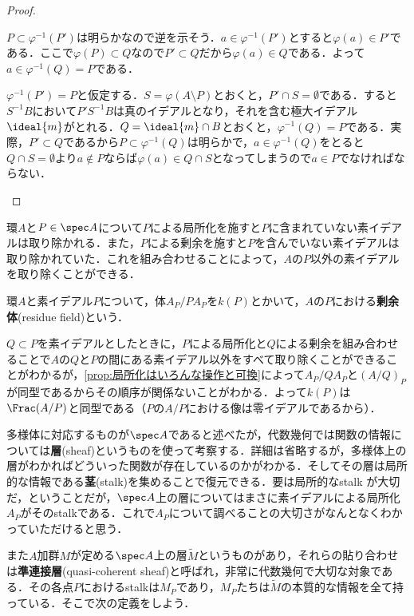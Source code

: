 \begin{proof}
	\begin{eqv}
		\item $P\subset\varphi^{-1}(P')$は明らかなので逆を示そう．$a\in\varphi^{-1}(P')$とすると$\varphi(a)\in P'$である．ここで$\varphi(P)\subset Q$なので$P'\subset Q$だから$\varphi(a)\in Q$である．よって$a\in\varphi^{-1}(Q)=P$である．
		
		\item 	$\varphi^{-1}(P')=P$と仮定する．$S=\varphi(A\setminus P)$とおくと，$P'\cap S=\emptyset$である．すると$S^{-1}B$において$P'S^{-1}B$は真のイデアルとなり，それを含む極大イデアル$\ideal{m}$がとれる．$Q=\ideal{m}\cap B$とおくと，$\varphi^{-1}(Q)=P$である．実際，$P'\subset Q$であるから$P\subset\varphi^{-1}(Q)$は明らかで，$a\in\varphi^{-1}(Q)$をとると$Q\cap S=\emptyset$より$a\not\in P$ならば$\varphi(a)\in Q\cap S$となってしまうので$a\in P$でなければならない．
	\end{eqv}
\end{proof}

環$A$と$P\in\spec A$について$P$による局所化を施すと$P$に含まれていない素イデアルは取り除かれる．また，$P$による剰余を施すと$P$を含んでいない素イデアルは取り除かれていた．これを組み合わせることによって，$A$の$P$以外の素イデアルを取り除くことができる．
\begin{defi}[剰余体]
	環$A$と素イデアル$P$について，体$A_P/PA_P$を$k(P)$とかいて，$A$の$P$における\textbf{剰余体}(residue field)という．
\end{defi}

$Q\subset P$を素イデアルとしたときに，$P$による局所化と$Q$による剰余を組み合わせることで$A$の$Q$と$P$の間にある素イデアル以外をすべて取り除くことができることがわかるが，\ref{prop:局所化はいろんな操作と可換}によって$A_P/QA_P$と$(A/Q)_P$が同型であるからその順序が関係ないことがわかる．よって$k(P)$は$\Frac (A/P)$と同型である（$P$の$A/P$における像は零イデアルであるから）．

\begin{tightcurve}
	多様体に対応するものが$\spec A$であると述べたが，代数幾何では関数の情報については\textbf{層}(sheaf)というものを使って考察する．詳細は省略するが，多様体上の層がわかればどういった関数が存在しているのかがわかる．そしてその層は局所的な情報である\textbf{茎}(stalk)を集めることで復元できる．要は局所的なstalk が大切だ，ということだが，$\spec A$上の層についてはまさに素イデアルによる局所化$A_P$がそのstalkである．これで$A_P$について調べることの大切さがなんとなくわかっていただけると思う．
	
	また$A$加群$M$が定める$\spec A$上の層$\widetilde{M}$というものがあり，それらの貼り合わせは\textbf{準連接層}(quasi-coherent sheaf)と呼ばれ，非常に代数幾何で大切な対象である．その各点$P$におけるstalkは$M_P$であり，$M_P$たちは$\widetilde{M}$の本質的な情報を全て持っている．そこで次の定義をしよう．
\end{tightcurve}


